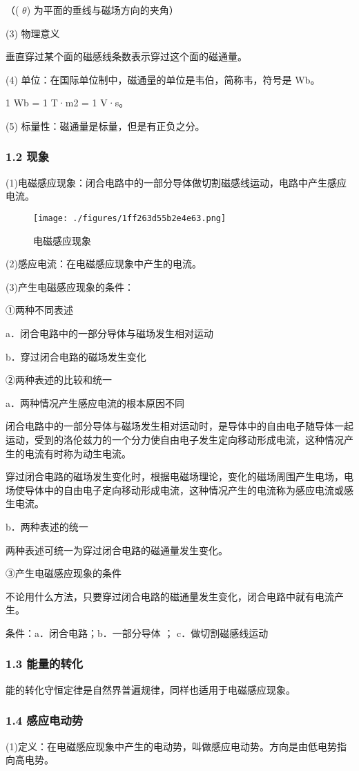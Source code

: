 （( $\theta$) 为平面的垂线与磁场方向的夹角）

(3) 物理意义

垂直穿过某个面的磁感线条数表示穿过这个面的磁通量。

(4) 单位：在国际单位制中，磁通量的单位是韦伯，简称韦，符号是 Wb。

1 Wb = 1 T·m2 = 1 V·s。

(5) 标量性：磁通量是标量，但是有正负之分。
\subsubsection{1.2 现象}
(1)电磁感应现象：闭合电路中的一部分导体做切割磁感线运动，电路中产生感应电流。
\begin{figure}[ht]
\centering
\texttt{[image: ./figures/1ff263d55b2e4e63.png]}
\caption{电磁感应现象} \label{fig_DCGY_2}
\end{figure}
(2)感应电流：在电磁感应现象中产生的电流。

(3)产生电磁感应现象的条件：

①两种不同表述

a．闭合电路中的一部分导体与磁场发生相对运动

b．穿过闭合电路的磁场发生变化

②两种表述的比较和统一

a．两种情况产生感应电流的根本原因不同

闭合电路中的一部分导体与磁场发生相对运动时，是导体中的自由电子随导体一起运动，受到的洛伦兹力的一个分力使自由电子发生定向移动形成电流，这种情况产生的电流有时称为动生电流。

穿过闭合电路的磁场发生变化时，根据电磁场理论，变化的磁场周围产生电场，电场使导体中的自由电子定向移动形成电流，这种情况产生的电流称为感应电流或感生电流。

b．两种表述的统一

两种表述可统一为穿过闭合电路的磁通量发生变化。

③产生电磁感应现象的条件

不论用什么方法，只要穿过闭合电路的磁通量发生变化，闭合电路中就有电流产生。

条件：a．闭合电路；b．一部分导体 ； c．做切割磁感线运动
\subsubsection{1.3 能量的转化}
能的转化守恒定律是自然界普遍规律，同样也适用于电磁感应现象。
\subsubsection{1.4 感应电动势}
(1)定义：在电磁感应现象中产生的电动势，叫做感应电动势。方向是由低电势指向高电势。

